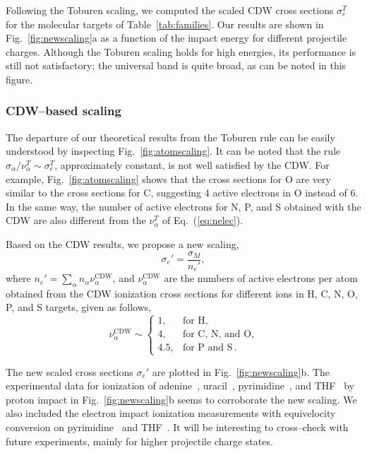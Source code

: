 \documentclass[10pt,showpacs,twocolumn]{revtex4}
\begin{document}
Following the Toburen scaling, we computed the scaled CDW cross sections 
$\sigma_{e}^T$ for the molecular targets of Table~\ref{tab:families}.
Our results are shown in Fig.~\ref{fig:newscaling}a as a function of 
the impact energy for different projectile charges. Although the 
Toburen scaling holds for high energies, its performance is still not 
satisfactory: the universal band is quite broad, as can be noted in 
this figure.

\subsubsection{CDW--based scaling}

The departure of our theoretical 
results from the Toburen rule can be easily understood 
by inspecting Fig.~\ref{fig:atomscaling}. It can be noted that the 
rule $\sigma_{\alpha}/\nu_{\alpha}^T\sim \sigma_{e}^T$, approximately 
constant, is not well satisfied by the CDW. 
For example, Fig.~\ref{fig:atomscaling} shows that the cross sections
for O are very similar to the cross sections for C, suggesting 
4 active electrons in O instead of 6. In the same way, the number of
active electrons for N, P, and S obtained with the CDW are also 
different from the $\nu_{\alpha}^T$ of Eq.~(\ref{eq:nelec}). 

Based on the CDW results, we propose a new scaling,
\begin{equation}
\sigma_{e}'=\frac{\sigma_M}{n_e'},
\label{32} 
\end{equation}
where $n_e'=\sum_{\alpha}n_{\alpha}\nu_{\alpha}^{\text{CDW}}$, and 
$\nu_{\alpha}^{\text{CDW}}$ are the numbers of active electrons
per atom obtained from the CDW ionization cross sections for 
different ions in H, C, N, O, P, and S targets, given as follows,
\begin{equation}
\nu_{\alpha }^{\text{CDW}} \sim\left\{ 
\begin{array}{ll}
1, & \text{for H,} \\
4, & \text{for C, N, and O,} \\ 
4.5, & \text{for P and S}\,.
\end{array}
\right. 
\label{eq:scalingCDW}
\end{equation}

The new scaled cross sections $\sigma_{e}'$ are plotted in 
Fig.~\ref{fig:newscaling}b. The experimental data for ionization of 
adenine~\cite{iriki2011}, uracil~\cite{itoh2013}, 
pyrimidine~\cite{wolff2014}, and THF~\cite{wang2016} by proton impact in
Fig.~\ref{fig:newscaling}b seems to corroborate the new scaling. 
We also included the electron impact ionization measurements with 
equivelocity conversion on pyrimidine~\cite{bug2017} and 
THF~\cite{bug2017,wolf2019,fuss2009}. 
It will be interesting to cross--check with future experiments, mainly 
for higher projectile charge states. 
\end{document}
